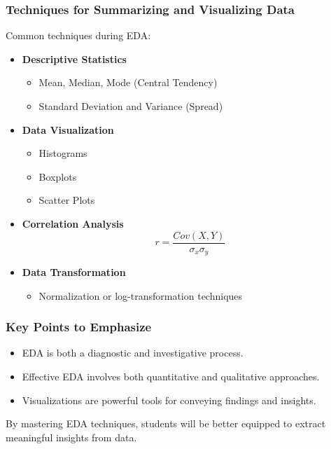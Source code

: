 \documentclass[aspectratio=169]{beamer}
\begin{document}
\begin{frame}[fragile]
    \frametitle{Techniques for Summarizing and Visualizing Data}
    
    Common techniques during EDA:
    
    \begin{itemize}
        \item \textbf{Descriptive Statistics}
            \begin{itemize}
                \item Mean, Median, Mode (Central Tendency)
                \item Standard Deviation and Variance (Spread)
            \end{itemize}
        \item \textbf{Data Visualization}
            \begin{itemize}
                \item Histograms
                \item Boxplots
                \item Scatter Plots
            \end{itemize}
        \item \textbf{Correlation Analysis}
            \begin{equation}
            r = \frac{Cov(X, Y)}{\sigma_x \sigma_y}
            \end{equation}
        \item \textbf{Data Transformation}
            \begin{itemize}
                \item Normalization or log-transformation techniques
            \end{itemize}
    \end{itemize}
\end{frame}

\begin{frame}[fragile]
    \frametitle{Key Points to Emphasize}
    
    \begin{itemize}
        \item EDA is both a diagnostic and investigative process.
        \item Effective EDA involves both quantitative and qualitative approaches.
        \item Visualizations are powerful tools for conveying findings and insights.
    \end{itemize}

    By mastering EDA techniques, students will be better equipped to extract meaningful insights from data.
\end{frame}
\end{document}
